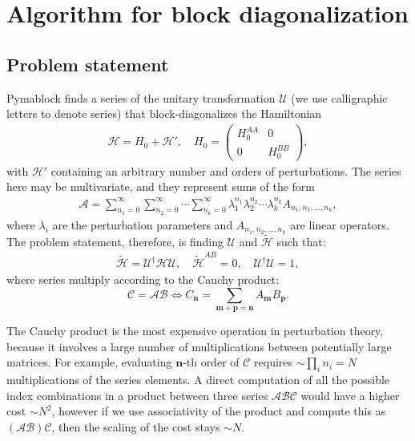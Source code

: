 \section{Algorithm for block diagonalization}

\subsection{Problem statement}

Pymablock finds a series of the unitary transformation $\mathcal{U}$ (we use
calligraphic letters to denote series) that block-diagonalizes the Hamiltonian
%
\begin{align}
\label{hamiltonian}
\mathcal{H} = H_0 + \mathcal{H}',\quad H_0 = \begin{pmatrix}
H_0^{AA} & 0\\
0 & H_0^{BB}
\end{pmatrix},
\end{align}
%
with $\mathcal{H}'$ containing an arbitrary number and orders of perturbations.
The series here may be multivariate, and they represent sums of the form
%
\begin{align}
\mathcal{A} = \sum_{n_1=0}^\infty \sum_{n_2=0}^\infty \cdots \sum_{n_k=0}^\infty \lambda_1^{n_1} \lambda_2^{n_2} \cdots \lambda_k^{n_k} A_{n_1, n_2, \ldots, n_k},
\end{align}
%
where $\lambda_i$ are the perturbation parameters and $A_{n_1, n_2, \ldots,
n_k}$ are linear operators.
%
The problem statement, therefore, is finding $\mathcal{U}$ and
$\tilde{\mathcal{H}}$ such that:
%
\begin{align}
\label{eq:problem_definition}
\tilde{\mathcal{H}} = \mathcal{U}^\dagger \mathcal{H} \mathcal{U},\quad \tilde{\mathcal{H}}^{AB} = 0,\quad \mathcal{U}^\dagger \mathcal{U} = 1,
\end{align}
%
where series multiply according to the Cauchy product:
%
$$
\mathcal{C} = \mathcal{A}\mathcal{B} \Leftrightarrow C_\mathbf{n} = \sum_{\mathbf{m} + \mathbf{p} = \mathbf{n}} A_\mathbf{m} B_\mathbf{p}.
$$
%

The Cauchy product is the most expensive operation in perturbation theory,
because it involves a large number of multiplications between potentially large
matrices.
For example, evaluating $\mathbf{n}$-th order of $\mathcal{C}$ requires
$\sim\prod_i n_i = N$ multiplications of the series elements.
A direct computation of all the possible index combinations in a product
between three series $\mathcal{A}\mathcal{B}\mathcal{C}$ would have a higher
cost $\sim N^2$, however if we use associativity of the product and compute
this as $(\mathcal{A}\mathcal{B})\mathcal{C}$, then the scaling of the cost
stays $\sim N$.

